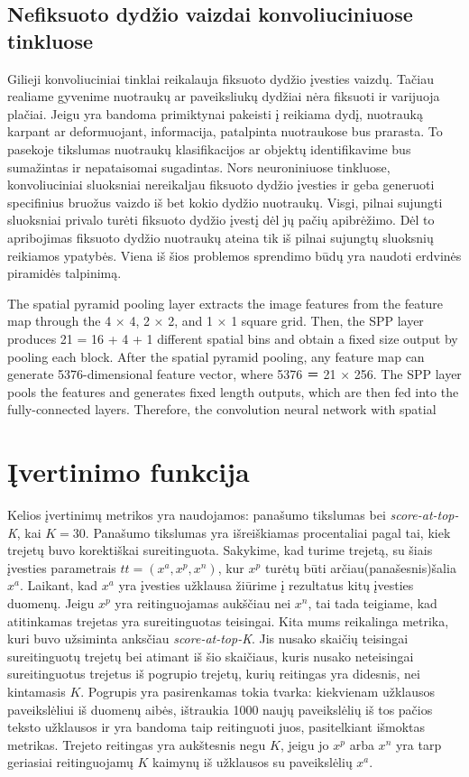 \documentclass{VUMIFPSkursinis}
\begin{document}
\subsection{Nefiksuoto dydžio vaizdai konvoliuciniuose tinkluose}
Gilieji konvoliuciniai tinklai reikalauja fiksuoto dydžio įvesties vaizdų. Tačiau realiame gyvenime nuotraukų ar paveiksliukų dydžiai nėra fiksuoti ir varijuoja plačiai.
\linebreak
Jeigu yra bandoma primiktynai pakeisti į reikiama dydį, nuotrauką karpant ar deformuojant, informacija, patalpinta nuotraukose bus prarasta. To pasekoje tikslumas nuotraukų klasifikacijos ar objektų identifikavime bus sumažintas ir nepataisomai sugadintas. Nors neuroniniuose tinkluose, konvoliuciniai sluoksniai nereikaljau fiksuoto dydžio įvesties ir geba generuoti specifinius bruožus vaizdo iš bet kokio dydžio nuotraukų. Visgi, pilnai sujungti sluoksniai privalo turėti fiksuoto dydžio įvestį dėl jų pačių apibrėžimo. Dėl to apribojimas fiksuoto dydžio nuotraukų ateina tik iš pilnai sujungtų sluoksnių reikiamos ypatybės.
Viena iš šios problemos sprendimo būdų yra naudoti erdvinės piramidės talpinimą\cite{Spatial_pyramid_pooling}.
\linebreak

The spatial pyramid pooling layer extracts the image features from the feature map through the 4 × 4, 2 × 2, and 1 × 1 square grid. Then, the SPP layer produces 21 = 16 + 4 + 1 different spatial bins and obtain a fixed size output by pooling each block. After the spatial pyramid pooling, any feature map can generate 5376-dimensional feature vector, where 5376 ＝ 21 × 256. The SPP layer pools the features and generates fixed length outputs, which are then fed into the fully-connected layers. Therefore, the convolution neural network with spatial
\pagebreak

\section{Įvertinimo funkcija}
Kelios įvertinimų metrikos yra naudojamos: panašumo tikslumas bei \emph{score-at-top-K}, kai $K = 30$. Panašumo tikslumas yra išreiškiamas procentaliai pagal tai, kiek trejetų buvo korektiškai sureitinguota. Sakykime, kad turime trejetą, su šiais įvesties parametrais $tt = (x^a, x^p, x^n)$, kur $x^p$ turėtų būti arčiau(panašesnis)šalia $x^a$. Laikant, kad $x^a$ yra įvesties užklausa žiūrime į rezultatus kitų įvesties duomenų. Jeigu $x^p$ yra reitinguojamas aukščiau nei $x^n$, tai tada teigiame, kad atitinkamas trejetas yra sureitinguotas teisingai. Kita mums reikalinga metrika, kuri buvo užsiminta anksčiau \emph{score-at-top-K}. Jis nusako skaičių teisingai sureitinguotų trejetų bei atimant iš šio skaičiaus, kuris nusako neteisingai sureitinguotus trejetus iš pogrupio trejetų, kurių reitingas yra didesnis, nei kintamasis $K$. Pogrupis yra pasirenkamas tokia tvarka: kiekvienam užklausos paveikslėliui iš duomenų aibės, ištraukia 1000 naujų paveikslėlių iš tos pačios teksto užklausos ir yra bandoma taip reitinguoti juos, pasitelkiant išmoktas metrikas. Trejeto reitingas yra aukštesnis negu $K$, jeigu jo $x^p$ arba $x^n$ yra tarp geriasiai reitinguojamų $K$ kaimynų iš užklausos su paveikslėlių $x^a$.
\pagebreak
\end{document}
